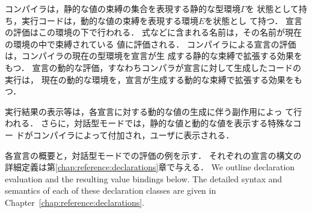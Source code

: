 \documentclass{jbook}
\newcommand{\ass}{\Gamma}
\begin{document}
\ifjp%
	コンパイラは，静的な値の束縛の集合を表現する静的な型環境$\ass$を
状態として持ち，実行コードは，動的な値の束縛を表現する環境$E$を状態とし
て持つ．
	宣言の評価はこの環境の下で行われる．
	式などに含まれる名前は，その名前が現在の環境の中で束縛されている
値に評価される．
	コンパイラによる宣言の評価は，コンパイラの現在の型環境を宣言が生
成する静的な束縛で拡張する効果をもつ．
	宣言の動的な評価，すなわちコンパラが宣言に対して生成したコードの実行は，
現在の動的な環境を，宣言が生成する動的な束縛で拡張する効果をもつ．

	実行結果の表示等は，各宣言に対する動的な値の生成に伴う副作用によっ
て行われる．
	さらに，対話型モードでは，静的な値と動的な値を表示する特殊なコー
ドがコンパイラによって付加され，ユーザに表示される．

	各宣言の概要と，対話型モードでの評価の例を示す．
	それぞれの宣言の構文の詳細定義は第\ref{chap:reference:declarations}章で与える．
\else%
	We outline declaration evaluation and the resulting value
bindings below.
	The detailed syntax and semantics of each of these declaration
classes are given in Chapter~\ref{chap:reference:declarations}. 
\fi%
\end{document}
